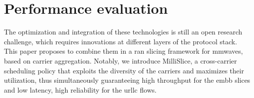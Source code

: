 \documentclass[a4paper, 12pt, oneside]{article}
\begin{document}
    \section*{Performance evaluation}
  The optimization and integration of these technologies is still an open research challenge, which requires innovations at different layers of the protocol stack. This paper proposes to combine them in a \gls{ran} slicing framework for \glspl{mmwave}, based on carrier aggregation. Notably, we introduce MilliSlice, a cross-carrier scheduling policy that exploits the diversity of the carriers and maximizes their utilization, thus simultaneously guaranteeing high throughput for the \gls{embb} slices and low latency, high reliability for the \gls{urllc} flows.



\end{document}

